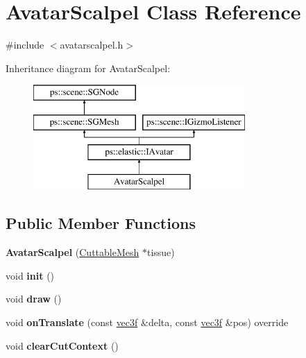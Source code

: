 \hypertarget{classAvatarScalpel}{}\section{Avatar\+Scalpel Class Reference}
\label{classAvatarScalpel}


{\ttfamily \#include $<$avatarscalpel.\+h$>$}

Inheritance diagram for Avatar\+Scalpel\+:\begin{figure}[H]
\begin{center}
\leavevmode
\includegraphics[height=4.000000cm]{classAvatarScalpel}
\end{center}
\end{figure}
\subsection*{Public Member Functions}
\begin{DoxyCompactItemize}
\item 
\hypertarget{classAvatarScalpel_a56bab72b7211d5aa7c0a3602d8905a60}{}{\bfseries Avatar\+Scalpel} (\hyperlink{classps_1_1CuttableMesh}{Cuttable\+Mesh} $\ast$tissue)\label{classAvatarScalpel_a56bab72b7211d5aa7c0a3602d8905a60}

\item 
\hypertarget{classAvatarScalpel_acfd5c4c6638cebb3b95a4475af4395b5}{}void {\bfseries init} ()\label{classAvatarScalpel_acfd5c4c6638cebb3b95a4475af4395b5}

\item 
\hypertarget{classAvatarScalpel_a916cf443f0db82175bf921812efb4d14}{}void {\bfseries draw} ()\label{classAvatarScalpel_a916cf443f0db82175bf921812efb4d14}

\item 
\hypertarget{classAvatarScalpel_ae325c4c5844301b1b80a71cabc3daaeb}{}void {\bfseries on\+Translate} (const \hyperlink{classps_1_1base_1_1Vec3}{vec3f} \&delta, const \hyperlink{classps_1_1base_1_1Vec3}{vec3f} \&pos) override\label{classAvatarScalpel_ae325c4c5844301b1b80a71cabc3daaeb}

\item 
\hypertarget{classAvatarScalpel_a33bec3285de5e608cf1b6494159975c2}{}void {\bfseries clear\+Cut\+Context} ()\label{classAvatarScalpel_a33bec3285de5e608cf1b6494159975c2}

\end{DoxyCompactItemize}
